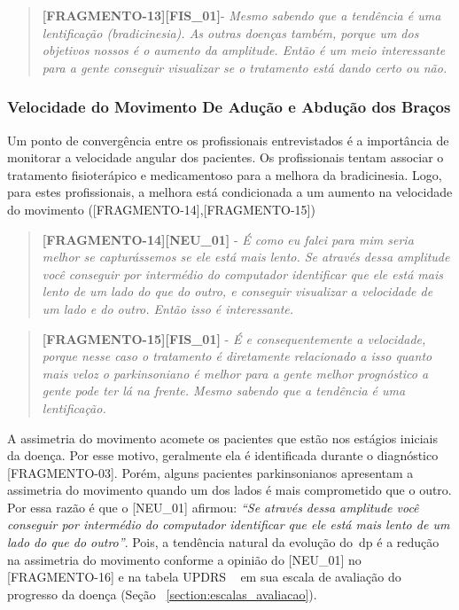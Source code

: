\begin{quote}
\textbf{[FRAGMENTO-13][FIS\_01]}-
\emph{
Mesmo sabendo que a tendência é uma lentificação (bradicinesia).  As outras doenças também, porque um dos objetivos nossos é o aumento da amplitude. Então é um meio interessante para a gente conseguir visualizar se o tratamento está dando certo ou não.
}
\end{quote}



\subsubsection{Velocidade do Movimento De Adução e Abdução dos Braços}
Um ponto de convergência entre os profissionais entrevistados é a importância de monitorar a velocidade angular dos pacientes. Os profissionais tentam associar o tratamento fisioterápico e medicamentoso para a melhora da bradicinesia. Logo, para estes profissionais, a melhora está condicionada a um aumento na velocidade do movimento ([FRAGMENTO-14],[FRAGMENTO-15])

\begin{quote}
\textbf{[FRAGMENTO-14][NEU\_01]} - 
\emph{
É como eu falei para mim seria melhor se capturássemos se ele está mais lento. Se através dessa amplitude você conseguir por intermédio do computador identificar que ele está mais lento de um lado do que do outro, e conseguir visualizar a velocidade de um lado e do outro. Então isso é interessante.
}
\end{quote}


\begin{quote}
\textbf{[FRAGMENTO-15][FIS\_01]} - 
\emph{
É e consequentemente a velocidade, porque nesse caso o tratamento é diretamente relacionado a isso quanto mais veloz o parkinsoniano é melhor para a gente melhor prognóstico a gente pode ter lá na frente. Mesmo sabendo que a tendência é uma lentificação.
}
\end{quote}


A assimetria do movimento acomete os pacientes que estão nos estágios iniciais da doença. Por esse motivo, geralmente ela é identificada durante o diagnóstico [FRAGMENTO-03]. Porém, alguns pacientes parkinsonianos apresentam a assimetria do movimento quando um dos lados é mais comprometido que o outro. Por essa razão é que o [NEU\_01] afirmou: \textit{``Se através dessa amplitude você conseguir por intermédio do computador identificar que ele está mais lento de um lado do que do outro''}. Pois, a tendência natural da evolução do~\ac{dp} é a redução na assimetria do movimento conforme a opinião do [NEU\_01] no [FRAGMENTO-16] e na tabela UPDRS ~\cite{updrs87} em sua escala de avaliação do progresso da doença (Seção ~\ref{section:escalas_avaliacao}).

